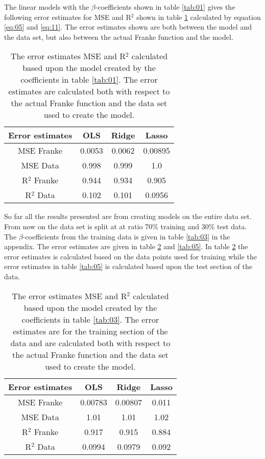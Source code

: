 \documentclass[uio,jmp,amsmath,amssymb,reprint,nofootinbib]{revtex4-1}
\numberwithin{equation}{section}
\begin{document}
The linear models with the \(\beta\)-coefficients shown in table \ref{tab:01} gives the following error estimates for MSE and R\(^2\) shown in table \ref{tab:02} calculated by equation \ref{eq:05} and \ref{eq:11}. The error estimates shown are both between the model and the data set, but also between the actual Franke function and the model.

\begin{table}
\begin{tabular}{|c|c|c|c|}\hline
Error estimates & OLS & Ridge & Lasso\\ \hline
MSE Franke & 0.0053 & 0.0062 & 0.00895 \\ \hline
MSE Data & 0.998 & 0.999 & 1.0 \\ \hline
R\(^2\) Franke & 0.944 & 0.934 & 0.905 \\ \hline
R\(^2\) Data & 0.102 & 0.101 & 0.0956 \\ \hline
\end{tabular}
\caption{The error estimates MSE and R\(^2\) calculated based upon the model created by the coefficients in table \ref{tab:01}. The error estimates are calculated both with respect to the actual Franke function and the data set used to create the model.}
\label{tab:02}
\end{table}

So far all the results presented are from creating models on the entire data set. From now on the data set is split at at ratio 70\% training and 30\% test data. The \(\beta\)-coefficients from the training data is given in table \ref{tab:03} in the appendix. The error estimates are given in table \ref{tab:04} and \ref{tab:05}. In table \ref{tab:04} the error estimates is calculated based on the data points used for training while the error estimates in table \ref{tab:05} is calculated based upon the test section of the data. 


\begin{table}
\begin{tabular}{|c|c|c|c|}\hline
Error estimates & OLS & Ridge & Lasso\\ \hline
MSE Franke & 0.00783 & 0.00807 & 0.011 \\ \hline
MSE Data & 1.01 & 1.01 & 1.02 \\ \hline
R\(^2\) Franke & 0.917 & 0.915 & 0.884 \\ \hline
R\(^2\) Data & 0.0994 & 0.0979 & 0.092 \\ \hline
\end{tabular}
\caption{The error estimates MSE and R\(^2\) calculated based upon the model created by the coefficients in table \ref{tab:03}. The error estimates are for the training section of the data and are calculated both with respect to the actual Franke function and the data set used to create the model.}
\label{tab:04}
\end{table}
\end{document}

